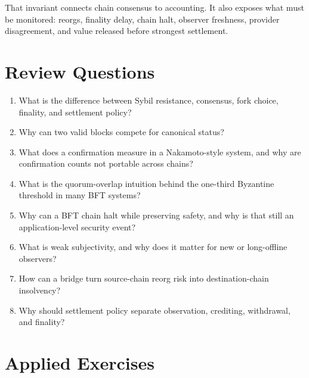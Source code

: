 That invariant connects chain consensus to accounting. It also exposes what must be monitored: reorgs, finality delay, chain halt, observer freshness, provider disagreement, and value released before strongest settlement.

\section*{Review Questions}

\begin{enumerate}
\item What is the difference between Sybil resistance, consensus, fork choice, finality, and settlement policy?
\item Why can two valid blocks compete for canonical status?
\item What does a confirmation measure in a Nakamoto-style system, and why are confirmation counts not portable across chains?
\item What is the quorum-overlap intuition behind the one-third Byzantine threshold in many BFT systems?
\item Why can a BFT chain halt while preserving safety, and why is that still an application-level security event?
\item What is weak subjectivity, and why does it matter for new or long-offline observers?
\item How can a bridge turn source-chain reorg risk into destination-chain insolvency?
\item Why should settlement policy separate observation, crediting, withdrawal, and finality?
\end{enumerate}

\section*{Applied Exercises}


